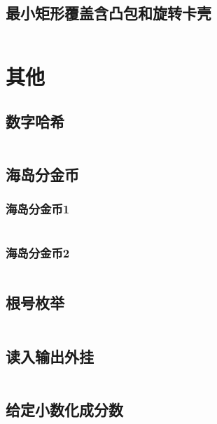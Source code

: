 \documentclass{article}
\begin{document}
\subsection{最小矩形覆盖含凸包和旋转卡壳}
\inputminted[breaklines]{c++}{../计算几何/最小矩形覆盖含凸包和旋转卡壳.cpp}

\newpage
\section{其他}
\subsection{数字哈希}
\inputminted[breaklines]{c++}{../其他/数字哈希.cpp}

\subsection{海岛分金币}
\subsubsection{海岛分金币1}
\inputminted[breaklines]{c++}{../其他/海岛分金币1.cpp}

\subsubsection{海岛分金币2}
\inputminted[breaklines]{c++}{../其他/海岛分金币2.cpp}

\subsection{根号枚举}
\inputminted[breaklines]{c++}{../其他/根号枚举.cpp}

\subsection{读入输出外挂}
\inputminted[breaklines]{c++}{../其他/读入输出外挂.cpp}

\subsection{给定小数化成分数}
\inputminted[breaklines]{python}{../其他/给定小数化成分数.py}

\end{document}
